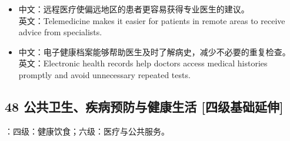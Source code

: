 \documentclass[a4paper,11pt,UTF8,fontset=none]{ctexart}
\begin{document}
\par

\begin{itemize}[leftmargin=1.7em,itemsep=1pt,parsep=0pt,topsep=2pt]
\item \noindent 中文：远程医疗使偏远地区的患者更容易获得专业医生的建议。\\ 英文：Telemedicine makes it easier for patients in remote areas to receive advice from specialists.\par


\item \noindent 中文：电子健康档案能够帮助医生及时了解病史，减少不必要的重复检查。\\ 英文：Electronic health records help doctors access medical histories promptly and avoid unnecessary repeated tests.\par


\end{itemize}

\subsection{48 公共卫生、疾病预防与健康生活 {\color{AccentBlue} [四级基础延伸]}}

\begin{tcolorbox}[enhanced,breakable,boxrule=0.35pt,colback=VeryPaleBlue,colframe=AccentBlue!40,left=7pt,right=7pt,top=4pt,bottom=4pt,borderline west={2pt}{0pt}{AccentBlue},before skip=4pt,after skip=6pt]
：四级：健康饮食；六级：医疗与公共服务。\par


\end{tcolorbox}
\end{document}
